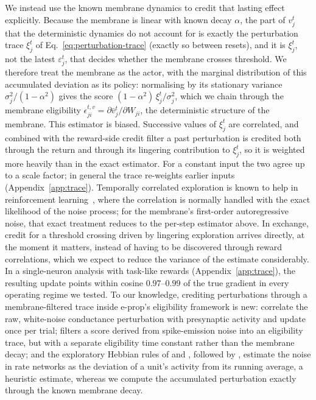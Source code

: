 \documentclass[10pt,twocolumn]{article}
\begin{document}
We instead use the known membrane dynamics to credit that lasting effect
explicitly. Because the membrane is linear with known decay $\alpha$, the part
of $v^t_j$ that the deterministic dynamics do not account for is exactly the
perturbation trace $\xi^t_j$ of Eq.~\eqref{eq:perturbation-trace} (exactly so
between resets), and it is $\xi^t_j$, not the latest $\varepsilon^t_j$, that
decides whether the membrane crosses threshold. We therefore treat the membrane
as the actor, with the marginal distribution of this accumulated deviation as
its policy: normalising by its stationary variance $\sigma_j^2/(1-\alpha^2)$
gives the score $(1-\alpha^2)\,\xi^t_j/\sigma_j^2$, which we chain through the
membrane eligibility $\epsilon^{t,v}_{ji}=\partial\bar v^t_j/\partial W_{ji}$,
the deterministic structure of the membrane. This estimator is biased.
Successive values of $\xi^t_j$ are correlated, and combined with the
reward-side credit filter a past perturbation is credited both through the
return and through its lingering contribution to $\xi^t_j$, so it is weighted
more heavily than in the exact estimator. For a constant input the two agree up
to a scale factor; in general the trace re-weights earlier inputs
(Appendix~\ref{app:trace}). Temporally correlated exploration is known to help
in reinforcement learning~\citep{Wawrzynski2015,vanHoof2017}, where the
correlation is normally handled with the exact likelihood of the noise process;
for the membrane's first-order autoregressive noise, that exact treatment
reduces to the per-step estimator above. In exchange, credit for a threshold crossing driven
by lingering exploration arrives directly, at the moment it matters, instead of
having to be discovered through reward correlations, which we expect to reduce
the variance of the estimate considerably. In a single-neuron analysis with
task-like rewards (Appendix~\ref{app:trace}), the resulting update points
within cosine $0.97$--$0.99$ of the true gradient in every operating regime we
tested. To our knowledge, crediting
perturbations through a membrane-filtered trace inside e-prop's eligibility
framework is new: \citet{fiete2006gradient} correlate the raw, white-noise
conductance perturbation with presynaptic activity and update once per trial;
\citet{Florian2007RewardSTDP} filters a score derived from spike-emission noise
into an eligibility trace, but with a separate eligibility time constant rather
than the membrane decay; and the exploratory Hebbian rules of
\citet{Legenstein2010EH} and \citet{Hoerzer2014}, followed by
\citet{Miconi2017}, estimate the noise in rate networks as the deviation of a
unit's activity from its running average, a heuristic estimate, whereas we
compute the accumulated perturbation exactly through the known membrane
decay.
\end{document}

